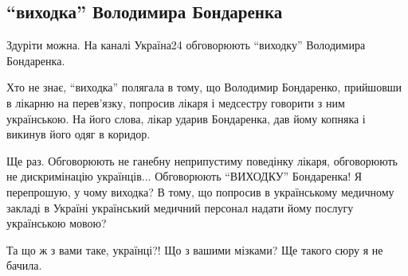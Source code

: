  
 
 
 
 
 
\subsection{\enquote{виходка} Володимира Бондаренка}
\label{sec:14_11_2020.fb.nitsoi_larysa.2.vyhodka_bondarenko}

Здуріти можна. На каналі Україна24 обговорюють \enquote{виходку} Володимира Бондаренка. 

Хто не знає, \enquote{виходка} полягала в тому, що Володимир Бондаренко, прийшовши в лікарню на перев'язку, попросив лікаря і медсестру говорити з ним українською. На його слова, лікар ударив Бондаренка, дав йому копняка і викинув його одяг в коридор. 

Ще раз. Обговорюють не ганебну неприпустиму поведінку лікаря, обговорюють не
дискримінацію українців... Обговорюють \enquote{ВИХОДКУ} Бондаренка!  Я
перепрошую, у чому виходка? В тому, що попросив в українському медичному
закладі в Україні український медичний персонал надати йому послугу українською
мовою? 

Та що ж з вами таке, українці?! Що з вашими мізками? Ще такого сюру я не
бачила.
